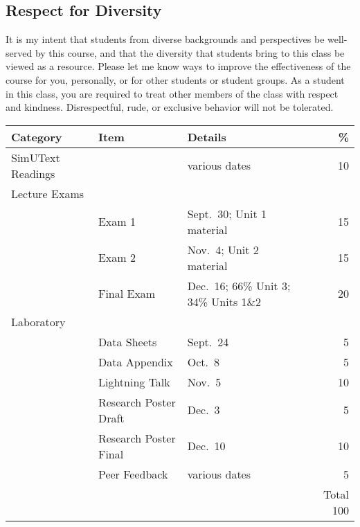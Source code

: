 \documentclass{tufte-handout}
\begin{document}
\begin{fullwidth}
\subsection{Respect for Diversity}

It is my intent that students from diverse backgrounds and perspectives be well-served by this course, and that the diversity that students bring to this class be viewed as a resource. Please let me know ways to improve the effectiveness of the course for you, personally, or for other students or student groups. As a student in this class, you are required to treat other members of the class with respect and kindness. Disrespectful, rude, or exclusive behavior will not be tolerated.

\end{fullwidth}


\begin{fullwidth}

\begin{table}
\begin{tabular}{l l l r}
Category & Item & Details & \% \\
\hline
SimUText Readings &  & various dates & 10\\
\hline
Lecture Exams \\
& Exam 1 & Sept.~30; Unit 1 material & 15 \\
& Exam 2 & Nov.~4; Unit 2 material & 15 \\
& Final Exam & Dec.~16; 66\% Unit 3; 34\% Units 1\&2 & 20 \\ 							%
\hline
Laboratory & &  &  \\
& Data Sheets & Sept.~24 & 5 \\
& Data Appendix & Oct.~8 & 5 \\
& Lightning Talk & Nov.~5 & 10 \\
& Research Poster Draft & Dec.~3 & 5 \\
& Research Poster Final & Dec.~10 & 10 \\
& Peer Feedback & various dates & 5 \\
\hline
& & & Total 100
\end{tabular}
\end{table}

\end{fullwidth}
\end{document}
